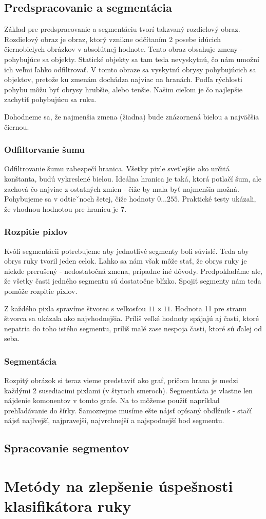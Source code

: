 \subsection{Predspracovanie a segmentácia}\label{chap:preprocess}

Základ pre predspracovanie a segmentáciu tvorí takzvaný rozdielový obraz. Rozdielový obraz je obraz, ktorý vznikne odčítaním 2 posebe idúcich čiernobielych obrázkov v absolútnej hodnote. Tento obraz obsahuje zmeny - pohybujúce sa objekty. Statické objekty sa tam teda nevyskytnú, čo nám umožní ich veľmi ľahko odfiltrovať. V tomto obraze sa vyskytnú obrysy pohybujúcich sa objektov, pretože ku zmenám dochádza najviac na hranách. Podľa rýchlosti pohybu môžu byť obrysy hrubšie, alebo tenšie. 
Našim cieľom je čo najlepšie zachytiť pohybujúcu sa ruku.

Dohodneme sa, že najmenšia zmena (žiadna) bude znázornená bielou a najväčšia čiernou. 

\subsubsection{Odfiltorvanie šumu}
Odfiltrovanie šumu zabezpečí hranica. Všetky pixle svetlejšie ako určitá konštanta, budú vykreslené bielou. Ideálna hranica je taká, ktorá potlačí šum, ale zachová čo najviac z ostatných zmien - čiže by mala byť najmenšia možná. Pohybujeme sa v odtieˇnoch šetej, čiže hodnoty $0\dots 255$. Praktické testy ukázali, že vhodnou hodnotou pre hranicu je 7.

\subsubsection{Rozpitie pixlov}

Kvôli segmentácii potrebujeme aby jednotlivé segmenty boli súvislé. Teda aby obrys ruky tvoril jeden celok.
Ľahko sa nám však môže stať, že obrys ruky je niekde prerušený - nedostatočná zmena, prípadne iné dôvody. Predpokladáme ale, že všetky časti jedného segmentu sú dostatočne blízko. Spojiť segmenty nám teda pomôže rozpitie pixlov. 

Z každého pixla spravíme štvorec s veľkosťou $11\times 11$.
Hodnota 11 pre stranu štvorca sa ukázala ako najvhodnejšia. 
Príliš veľké hodnoty spájajú aj časti, ktoré nepatria do toho istého segmentu, príliš malé zase nespoja časti, ktoré sú ďalej od seba.

\subsubsection{Segmentácia}
Rozpitý obrázok si teraz vieme predstaviť ako graf, pričom hrana je medzi každými 2 susediacimi pixlami (v štyroch smeroch). Segmentácia je vlastne len nájdenie komonentov v tomto grafe. Na to môžeme použiť napríklad prehľadávanie do šírky. Samozrejme musíme ešte nájsť opísaný obdĺžnik - stačí nájsť najľvejší, najpravejší, najvrchnejší a najspodnejší bod segmentu.

\subsection{Spracovanie segmentov}

\section{Metódy na zlepšenie úspešnosti klasifikátora ruky}

